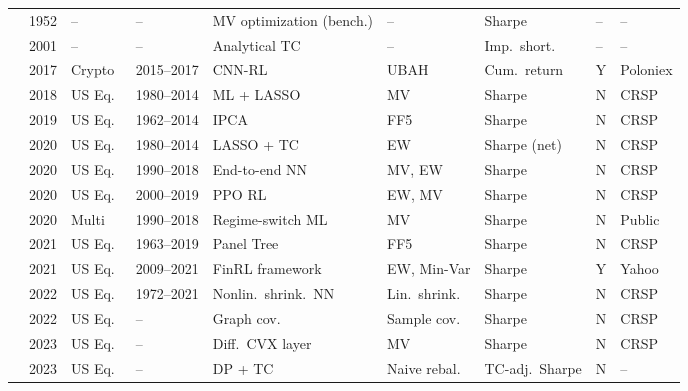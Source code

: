 \begin{longtable}{p{2.4cm} p{0.6cm} p{1.0cm} p{1.0cm} p{2.0cm} p{1.5cm} p{1.3cm} p{0.7cm} p{1.3cm}}
\citet{Markowitz1952}  & 1952 & --     & --         & MV optimization (bench.) & --        & Sharpe       & -- & --     \\
\citet{Almgren2001}    & 2001 & --     & --         & Analytical TC     & --               & Imp.\ short. & -- & --     \\
\citet{Jiang2017}      & 2017 & Crypto & 2015--2017 & CNN-RL            & UBAH             & Cum.\ return & Y & Poloniex \\
\citet{Ban2018}        & 2018 & US Eq.\ & 1980--2014 & ML + LASSO        & MV             & Sharpe       & N & CRSP   \\
\citet{Kelly2019}      & 2019 & US Eq.\ & 1962--2014 & IPCA              & FF5            & Sharpe       & N & CRSP   \\
\citet{DeMiguel2020}   & 2020 & US Eq.\ & 1980--2014 & LASSO + TC       & EW             & Sharpe (net) & N & CRSP   \\
\citet{Zhang2020}      & 2020 & US Eq.\ & 1990--2018 & End-to-end NN     & MV, EW         & Sharpe       & N & CRSP   \\
\citet{Ye2020}         & 2020 & US Eq.\ & 2000--2019 & PPO RL            & EW, MV         & Sharpe       & N & CRSP   \\
\citet{Nystrup2020}    & 2020 & Multi  & 1990--2018 & Regime-switch ML  & MV             & Sharpe       & N & Public \\
\citet{Cong2021}       & 2021 & US Eq.\ & 1963--2019 & Panel Tree        & FF5            & Sharpe       & N & CRSP   \\
\citet{Wang2021}       & 2021 & US Eq.\ & 2009--2021 & FinRL framework   & EW, Min-Var    & Sharpe       & Y & Yahoo  \\
\citet{Ledoit2022}     & 2022 & US Eq.\ & 1972--2021 & Nonlin.\ shrink.\ NN & Lin.\ shrink.\ & Sharpe   & N & CRSP   \\
\citet{Zhao2022}       & 2022 & US Eq.\ & --         & Graph cov.        & Sample cov.\   & Sharpe       & N & CRSP   \\
\citet{Butler2023}     & 2023 & US Eq.\ & --         & Diff.\ CVX layer  & MV             & Sharpe       & N & CRSP   \\
\citet{Moallemi2023}   & 2023 & US Eq.\ & --         & DP + TC           & Naive rebal.\  & TC-adj.\ Sharpe & N & --  \\

\end{longtable}

